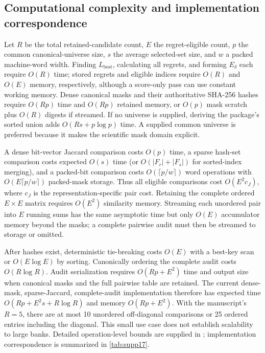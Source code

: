 \subsection{Computational complexity and implementation correspondence}

Let $R$ be the total retained-candidate count, $E$ the regret-eligible count, $p$ the common canonical-universe size, $s$ the average selected-set size, and $w$ a packed machine-word width. Finding $L_{\mathrm{best}}$, calculating all regrets, and forming $E_\delta$ each require $O(R)$ time; stored regrets and eligible indices require $O(R)$ and $O(E)$ memory, respectively, although a score-only pass can use constant working memory. Dense canonical masks and their authoritative SHA-256 hashes require $O(Rp)$ time and $O(Rp)$ retained memory, or $O(p)$ mask scratch plus $O(R)$ digests if streamed. If no universe is supplied, deriving the package's sorted union adds $O(Rs+p\log p)$ time. A supplied common universe is preferred because it makes the scientific mask domain explicit.

A dense bit-vector Jaccard comparison costs $O(p)$ time, a sparse hash-set comparison costs expected $O(s)$ time (or $O(|F_r|+|F_s|)$ for sorted-index merging), and a packed-bit comparison costs $O(\lceil p/w\rceil)$ word operations with $O(E\lceil p/w\rceil)$ packed-mask storage. Thus all eligible comparisons cost $O(E^2c_J)$, where $c_J$ is the representation-specific pair cost. Retaining the complete ordered $E\times E$ matrix requires $O(E^2)$ similarity memory. Streaming each unordered pair into $E$ running sums has the same asymptotic time but only $O(E)$ accumulator memory beyond the masks; a complete pairwise audit must then be streamed to storage or omitted.

After hashes exist, deterministic tie-breaking costs $O(E)$ with a best-key scan or $O(E\log E)$ by sorting. Canonically ordering the complete audit costs $O(R\log R)$. Audit serialization requires $O(Rp+E^2)$ time and output size when canonical masks and the full pairwise table are retained. The current dense-mask, sparse-Jaccard, complete-audit implementation therefore has expected time $O(Rp+E^2s+R\log R)$ and memory $O(Rp+E^2)$. With the manuscript's $R=5$, there are at most 10 unordered off-diagonal comparisons or 25 ordered entries including the diagonal. This small use case does not establish scalability to large banks. Detailed operation-level bounds are supplied in ; implementation correspondence is summarized in \cref{tab:supp17}.


